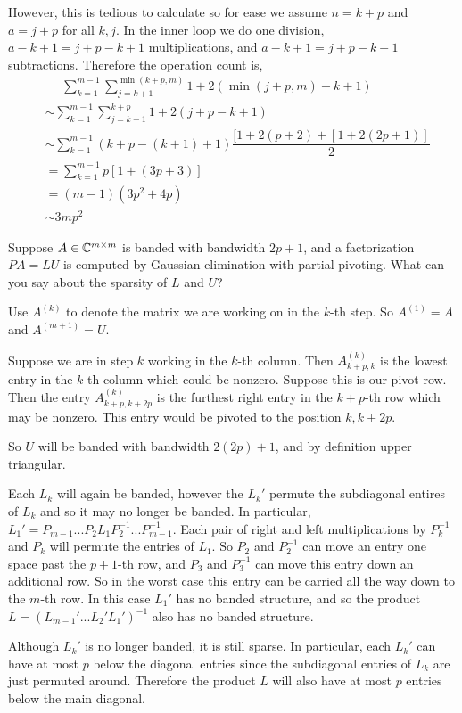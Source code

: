 \documentclass[10pt]{article}
\begin{document}
\begin{solution}[Solution]
However, this is tedious to calculate so for ease we assume \( n=k+p \) and \( a=j+p \) for all \( k,j \). In the inner loop we do one division, \( a-k+1 = j+p-k+1 \) multiplications, and \( a-k+1 = j+p-k+1 \) subtractions. Therefore the operation count is,
\begin{align*}
    &\phantom{=}\sum_{k=1}^{m-1} \sum_{j=k+1}^{\min(k+p,m)} 1+2(\min(j+p,m)-k+1) \\ 
    &\sim\sum_{k=1}^{m-1} \sum_{j=k+1}^{k+p}1+2(j+p-k+1) \\ 
    &\sim \sum_{k=1}^{m-1} (k+p-(k+1)+1)\dfrac{[1+2(p+2)+[1+2(2p+1)]}{2} \\
    &= \sum_{k=1}^{m-1} p[1+(3p+3)] \\
    &= (m-1)(3p^2+4p) \\
    &\sim 3mp^2
\end{align*}

\end{solution}


\begin{problem}[Exercise 21.2]
Suppose \( A\in\mathbb{C}^{m\times m} \) is banded with bandwidth \( 2p+1 \), and a factorization \( PA=LU \) is computed by Gaussian elimination with partial pivoting. What can you say about the sparsity of \( L \) and \( U \)?
\end{problem}

\begin{solution}[Solution]
Use \( A^{(k)} \) to denote the matrix we are working on in the \( k \)-th step. So \( A^{(1)} = A \) and \( A^{(m+1)} = U \).

Suppose we are in step \( k \) working in the \( k \)-th column. Then \( A^{(k)}_{k+p,k} \) is the lowest entry in the \( k \)-th column which could be nonzero. Suppose this is our pivot row. Then the entry \( A^{(k)}_{k+p,k+2p} \) is the furthest right entry in the \( k+p \)-th row which may be nonzero. This entry would be pivoted to the position \( k,k+2p \). 

So \( U \) will be banded with bandwidth \( 2(2p)+1 \), and by definition upper triangular.

Each \( L_k \) will again be banded, however the \( L_k' \) permute the subdiagonal entires of \( L_k \) and so it may no longer be banded. In particular, \( L_1' = P_{m-1} ... P_2L_1P_2^{-1} ... P_{m-1}^{-1} \). Each pair of right and left multiplications by \( P_k^{-1} \) and \( P_k \) will permute the entries of \( L_1 \). So \( P_2 \) and \( P_2^{-1} \) can move an entry one space past the \( p+1 \)-th row, and \( P_3 \) and \( P_3^{-1} \) can move this entry down an additional row. So in the worst case this entry can be carried all the way down to the \( m \)-th row. In this case \( L_1' \) has no banded structure, and so the product \( L=(L_{m-1}'...L_2'L_1')^{-1} \) also has no banded structure.

Although \( L_k' \) is no longer banded, it is still sparse. In particular, each \( L_k' \) can have at most \( p \) below the diagonal entries since the subdiagonal entries of \( L_k \) are just permuted around. Therefore the product \( L \) will also have at most \( p \) entries below the main diagonal.

\end{solution}
\end{document}
